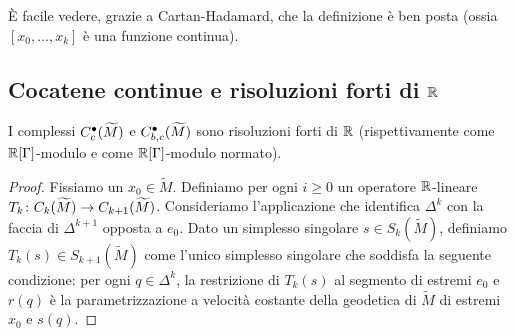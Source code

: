 È facile vedere, grazie a Cartan-Hadamard, che la definizione è ben posta (ossia $[x_0,\ldots,x_k]$ è una funzione continua).

\subsection{Cocatene continue e risoluzioni forti di $\mathbb{R}$}

\begin{proposition}
I complessi $C^\bullet_c(\widetilde M)$ e $C^\bullet_{b,c}(\widetilde M)$ sono risoluzioni  forti di $\mathbb{R}$ (rispettivamente come $\mathbb{R}[\Gamma]$-modulo e come $\mathbb{R}[\Gamma]$-modulo normato).
\end{proposition}
\begin{proof}
Fissiamo un $x_0\in\widetilde M$. Definiamo per ogni $i\ge 0$ un operatore $\mathbb{R}$-lineare $\map{T_k}{C_k(\widetilde M)}{C_{k+1}(\widetilde M)}$. Consideriamo l'applicazione
che identifica $\Delta^k$ con la faccia di $\Delta^{k+1}$ opposta a $e_0$. Dato un simplesso singolare $s\in S_k(\widetilde M)$, definiamo $T_k(s)\in S_{k+1}(\widetilde M)$ come l'unico simplesso singolare che soddisfa la seguente condizione: per ogni $q\in\Delta^k$, la restrizione di $T_k(s)$ al segmento di estremi $e_0$ e $r(q)$ è la parametrizzazione a velocità costante della geodetica di $\widetilde M$ di estremi $x_0$ e $s(q)$.
\end{proof}